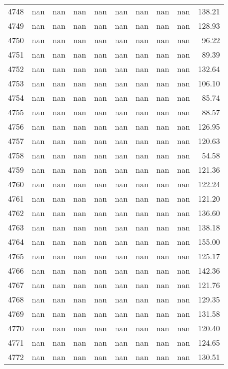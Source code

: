 \begin{tabular}{lrrrrrrrrr}
4748 & nan & nan & nan & nan & nan & nan & nan & nan & 138.21 \\
4749 & nan & nan & nan & nan & nan & nan & nan & nan & 128.93 \\
4750 & nan & nan & nan & nan & nan & nan & nan & nan & 96.22 \\
4751 & nan & nan & nan & nan & nan & nan & nan & nan & 89.39 \\
4752 & nan & nan & nan & nan & nan & nan & nan & nan & 132.64 \\
4753 & nan & nan & nan & nan & nan & nan & nan & nan & 106.10 \\
4754 & nan & nan & nan & nan & nan & nan & nan & nan & 85.74 \\
4755 & nan & nan & nan & nan & nan & nan & nan & nan & 88.57 \\
4756 & nan & nan & nan & nan & nan & nan & nan & nan & 126.95 \\
4757 & nan & nan & nan & nan & nan & nan & nan & nan & 120.63 \\
4758 & nan & nan & nan & nan & nan & nan & nan & nan & 54.58 \\
4759 & nan & nan & nan & nan & nan & nan & nan & nan & 121.36 \\
4760 & nan & nan & nan & nan & nan & nan & nan & nan & 122.24 \\
4761 & nan & nan & nan & nan & nan & nan & nan & nan & 121.20 \\
4762 & nan & nan & nan & nan & nan & nan & nan & nan & 136.60 \\
4763 & nan & nan & nan & nan & nan & nan & nan & nan & 138.18 \\
4764 & nan & nan & nan & nan & nan & nan & nan & nan & 155.00 \\
4765 & nan & nan & nan & nan & nan & nan & nan & nan & 125.17 \\
4766 & nan & nan & nan & nan & nan & nan & nan & nan & 142.36 \\
4767 & nan & nan & nan & nan & nan & nan & nan & nan & 121.76 \\
4768 & nan & nan & nan & nan & nan & nan & nan & nan & 129.35 \\
4769 & nan & nan & nan & nan & nan & nan & nan & nan & 131.58 \\
4770 & nan & nan & nan & nan & nan & nan & nan & nan & 120.40 \\
4771 & nan & nan & nan & nan & nan & nan & nan & nan & 124.65 \\
4772 & nan & nan & nan & nan & nan & nan & nan & nan & 130.51 \\

\end{tabular}
